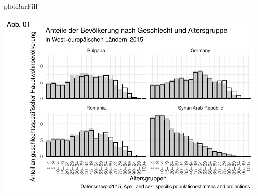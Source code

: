 \documentclass[
]{article}
\newenvironment{Shaded}{\begin{snugshade}}{\end{snugshade}}
\newcommand{\NormalTok}[1]{#1}
\begin{document}
\begin{Shaded}
\begin{Highlighting}[]
\NormalTok{plotBarFill}
\end{Highlighting}
\end{Shaded}

\includegraphics{ggplot2_files/figure-latex/unnamed-chunk-12-1.pdf}
\end{document}
